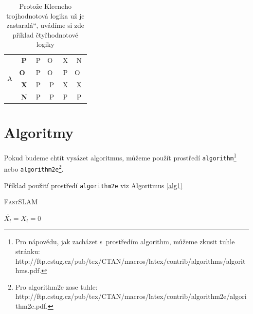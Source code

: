 \documentclass[11pt,a4paper]{article}
\newcommand{\myuv}[1]{\quotedblbase #1\textquotedblleft}
\begin{document}
\begin{table}[h]
\begin{center}
\begin{tabular}{|c|c|c|c|c|c|}
        \multirow{4}{*}{A} & \bf P &  P &  O~&  X &  N \\ \cline{2-6}
        \multirow{4}{*}{} & \bf O~&  P &  O~&  P &  O~\\  \cline{2-6}
        \multirow{4}{*}{} & \bf X &  P &  P &  X &  X \\  \cline{2-6}
        \multirow{4}{*}{} & \bf N &  P &  P &  P &  P \\  \cline{2-6}
        \hline
    \end{tabular}
    \end{center}
    \caption{Protože Kleeneho trojhodnotová logika už je \myuv{zastaralá}, uvádíme si zde příklad čtyřhodnotové logiky}
    \label{tab2}
\end{table}

\clearpage
\section{Algoritmy} \label{sec:algo}
Pokud budeme chtít vysázet algoritmus, můžeme použít prostředí \texttt{algorithm}\footnote{\raggedright Pro nápovědu, jak zacházet s~prostředím algorithm, můžeme zkusit tuhle stránku: http://ftp.cstug.cz/pub/tex/CTAN/macros/latex/contrib/algorithms/algorithms.pdf.} nebo \texttt{algorithm2e}\footnote{Pro algorithm2e zase tuhle: http://ftp.cstug.cz/pub/tex/CTAN/macros/latex/contrib/algorithm2e/algorithm2e.pdf.
}.

\noindent
Příklad použití prostředí \texttt{algorithm2e} viz Algoritmus \ref{alg1}

\IncMargin{1em}
\begin{algorithm}[h]
    \SetAlgoNoLine
    \caption{\textsc{FastSLAM}}
    \label{alg1}
    \Indm
    \Indp
    $\overline{X_t} = X_t = 0$

                                                                        
\end{algorithm}
\end{document}
